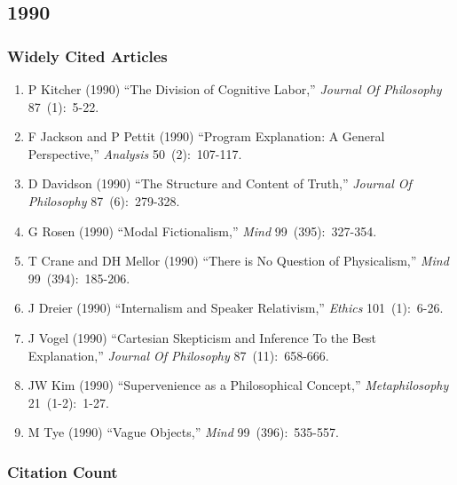 \documentclass[
  10pt,
  letterpaper,
  DIV=11,
  numbers=noendperiod,
  twoside]{scrartcl}
\providecommand{\tightlist}{%
  \setlength{\itemsep}{0pt}\setlength{\parskip}{0pt}}\usepackage{longtable,booktabs,array}
\begin{document}
\newpage

\subsection{1990}\label{sec-s1990}

\subsubsection*{Widely Cited Articles}\label{widely-cited-articles-33}

\begin{enumerate}
\def\labelenumi{\arabic{enumi}.}
\tightlist
\item
  P Kitcher (1990) ``The Division of Cognitive Labor,'' \emph{Journal Of
  Philosophy} 87~(1):~5-22.
\item
  F Jackson and P Pettit (1990) ``Program Explanation: A General
  Perspective,'' \emph{Analysis} 50~(2):~107-117.
\item
  D Davidson (1990) ``The Structure and Content of Truth,''
  \emph{Journal Of Philosophy} 87~(6):~279-328.
\item
  G Rosen (1990) ``Modal Fictionalism,'' \emph{Mind} 99~(395):~327-354.
\item
  T Crane and DH Mellor (1990) ``There is No Question of Physicalism,''
  \emph{Mind} 99~(394):~185-206.
\item
  J Dreier (1990) ``Internalism and Speaker Relativism,'' \emph{Ethics}
  101~(1):~6-26.
\item
  J Vogel (1990) ``Cartesian Skepticism and Inference To the Best
  Explanation,'' \emph{Journal Of Philosophy} 87~(11):~658-666.
\item
  JW Kim (1990) ``Supervenience as a Philosophical Concept,''
  \emph{Metaphilosophy} 21~(1-2):~1-27.
\item
  M Tye (1990) ``Vague Objects,'' \emph{Mind} 99~(396):~535-557.
\end{enumerate}

\subsubsection*{Citation Count}\label{sec-count-1990}
\end{document}
